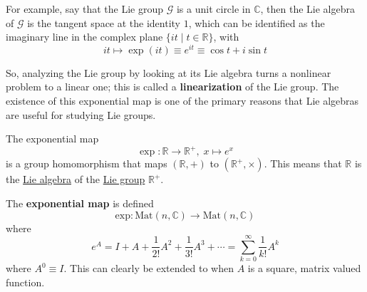   For example, say that the Lie group $\mathcal{G}$ is a unit circle in $\mathbb{C}$, then the Lie algebra of $\mathcal{G}$ is the tangent space at the identity $1$, which can be identified as the imaginary line in the complex plane $\{i t \; | \; t \in \mathbb{R}\}$, with 
  \begin{equation}
    i t \mapsto \exp(it) \equiv e^{it} \equiv \cos{t} + i \sin{t}
  \end{equation}

  \begin{center}
  \end{center}
  So, analyzing the Lie group by looking at its Lie algebra turns a nonlinear problem to a linear one; this is called a \textbf{linearization} of the Lie group. The existence of this exponential map is one of the primary reasons that Lie algebras are useful for studying Lie groups. 

  \begin{example}
    \label{ex:the-exponential-map-as-a-group-homomorphism}
    The exponential map 
    \begin{equation}
      \exp: \mathbb{R} \rightarrow \mathbb{R}^+, \; x \mapsto e^x
    \end{equation}
    is a group homomorphism that maps $(\mathbb{R}, +)$ to $(\mathbb{R}^+, \times)$. This means that $\mathbb{R}$ is the \hyperref[def:lie-algebra]{Lie algebra} of the \hyperref[def:lie-group]{Lie group} $\mathbb{R}^+$. 
  \end{example}

  \begin{definition}
    The \textbf{exponential map} is defined
    \begin{equation}
      \text{exp}: \text{Mat}(n, \mathbb{C}) \to \text{Mat}(n, \mathbb{C})
    \end{equation}
    where 
    \begin{equation}
      e^A = I + A + \frac{1}{2!} A^2 + \frac{1}{3!} A^3 + \cdots = \sum_{k=0}^\infty \frac{1}{k!} A^k
    \end{equation}
    where $A^0 \equiv I$. This can clearly be extended to when $A$ is a square, matrix valued function. 
  \end{definition}

